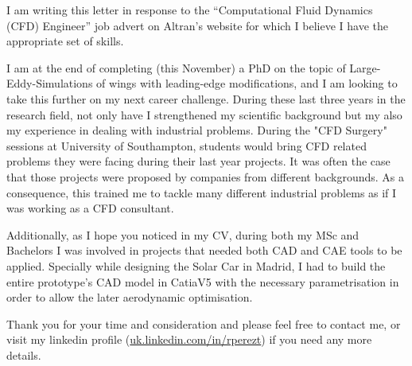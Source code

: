 \documentclass[10pt,stdletter,dateno,sigleft]{newlfm} %
\begin{document}
\begin{newlfm}


I am writing this letter in response to the ``Computational Fluid Dynamics (CFD)
Engineer'' job advert on Altran's website for which I believe I have the appropriate set of skills. 

I am at the end of completing (this November) a PhD on the topic of Large-Eddy-Simulations
of wings with leading-edge modifications, and I am looking to take this further on my next
career challenge. During these last three years in the research field, not only have I
strengthened my scientific background but my also my experience in dealing with industrial
problems. During the "CFD Surgery" sessions at University of Southampton, students would
bring CFD related problems they were facing during their last year projects. It was often
the case that those projects were proposed by companies from different backgrounds. As a
consequence, this trained me to tackle many different industrial problems as if I was
working as a CFD consultant.

Additionally, as I hope you noticed in my CV, during both my MSc and Bachelors I was
involved in projects that needed both CAD and CAE tools to be applied. Specially while
designing the Solar Car in Madrid, I had to build the entire prototype's CAD model in
CatiaV5 with the necessary parametrisation in order to allow the later aerodynamic
optimisation.

Thank you for your time and consideration and please feel free to contact me, or visit my
linkedin profile (\href{https://uk.linkedin.com/in/rperezt}{uk.linkedin.com/in/rperezt})
if you need any more details.


\end{newlfm}
\end{document}
